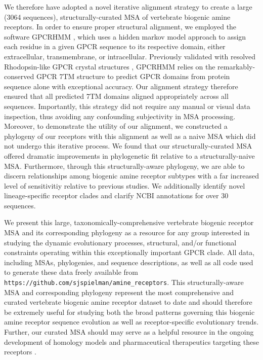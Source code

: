 \documentclass[fleqn,10pt]{wlpeerj}
\begin{document}
We therefore have adopted a novel iterative alignment strategy to create a large (3064 sequences), structurally-curated MSA of vertebrate biogenic amine receptors. In order to ensure proper structural alignment, we employed the software GPCRHMM \citep{Wistrand2006}, which uses a hidden markov model approach to assign each residue in a given GPCR sequence to its respective domain, either extracellular, transmembrane, or intracellular. Previously validated with resolved Rhodopsin-like GPCR crystal structures \citep{SpielmanWilke2013}, GPCRHMM relies on the remarkably-conserved GPCR 7TM structure to predict GPCR domains from protein sequence alone with exceptional accuracy. Our alignment strategy therefore ensured that all predicted 7TM domains aligned appropriately across all sequences. Importantly, this strategy did not require any manual or visual data inspection, thus avoiding any confounding subjectivity in MSA processing. Moreover, to demonstrate the utility of our alignment, we constructed a phylogeny of our receptors with this alignment as well as a naive MSA which did not undergo this iterative process. We found that our structurally-curated MSA offered dramatic improvements in phylogenetic fit relative to a structurally-naive MSA. Furthermore, through this structurally-aware phylogeny, we are able to discern relationships among biogenic amine receptor subtypes with a far increased level of sensitivitiy relative to previous studies. We additionally identify novel lineage-specific receptor clades and clarify NCBI annotations for over 30 sequences. 

We present this large, taxonomically-comprehensive vertebrate biogenic receptor MSA and its corresponding phylogeny as a resource for any group interested in studying the dynamic evolutionary processes, structural, and/or functional constraints operating within this exceptionally important GPCR clade. All data, including MSAs, phylogenies, and sequence descriptions, as well as all code used to generate these data freely available from \texttt{https://github.com/sjspielman/amine\_receptors}. This structurally-aware MSA and corresponding phylogeny represent the most comprehensive and curated vertebrate biogenic amine receptor dataset to date and should therefore be extremely useful for studying both the broad patterns governing this biogenic amine receptor sequence evolution as well as receptor-specific evolutionary trends. Further, our curated MSA should may serve as a helpful resource in the ongoing development of homology models and pharmaceutical therapeutics targeting these receptors \citep{Kristiansen2004,Ishiguro2004,Eversetal2005,Masonetal2012}.
\end{document}
